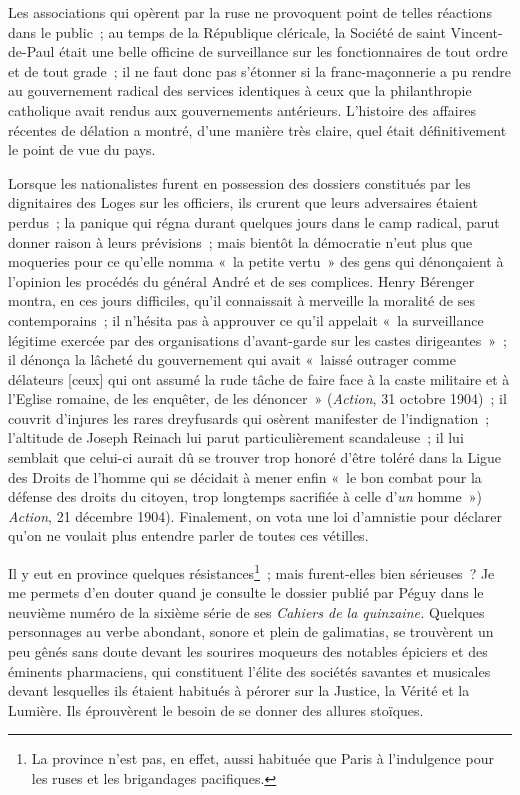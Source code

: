 \documentclass[french,twoside]{book} %
\begin{document}
Les associations qui opèrent par la ruse ne provoquent point de telles réactions dans le public ; au temps de la République cléricale, la Société de saint Vincent-de-Paul était une belle officine de surveillance sur les fonctionnaires de tout ordre et de tout grade ; il ne faut donc pas s’étonner si la franc-maçonnerie a pu rendre au gouvernement radical des services identiques à ceux que la philanthropie catholique avait rendus aux gouvernements antérieurs. L’histoire des affaires récentes de délation a montré, d’une manière très claire, quel était définitivement le point de vue du pays.\par
Lorsque les nationalistes furent en possession des dossiers constitués par les dignitaires des Loges sur les officiers, ils crurent que leurs adversaires étaient perdus ; la panique qui régna durant quelques jours dans le camp radical, parut donner raison à leurs prévisions ; mais bientôt la démocratie n’eut plus que moqueries pour ce qu’elle nomma « la petite vertu » des gens qui dénonçaient à l’opinion les procédés du général André et de ses complices. Henry Bérenger montra, en ces jours difficiles, qu’il connaissait à merveille la moralité de ses contemporains ; il n’hésita pas à approuver ce qu’il appelait « la surveillance légitime exercée par des organisations d’avant-garde sur les castes dirigeantes » ; il dénonça la lâcheté du gouvernement qui avait « laissé outrager comme délateurs [ceux] qui ont assumé la rude tâche de faire face à la caste militaire et à l’Eglise romaine, de les enquêter, de les dénoncer » (\emph{Action}, 31 octobre 1904) ; il couvrit d’injures les rares dreyfusards qui osèrent manifester de  l’indignation ; l’altitude de Joseph Reinach lui parut particulièrement scandaleuse ; il lui semblait que celui-ci aurait dû se trouver trop honoré d’être toléré dans la Ligue des Droits de l’homme qui se décidait à mener enfin « le bon combat pour la défense des droits du citoyen, trop longtemps sacrifiée à celle d’\emph{un} homme ») \emph{Action}, 21 décembre 1904). Finalement, on vota une loi d’amnistie pour déclarer qu’on ne voulait plus entendre parler de toutes ces vétilles.\par
Il y eut en province quelques résistances\footnote{ \noindent La province n’est pas, en effet, aussi habituée que Paris à l’indulgence pour les ruses et les brigandages pacifiques.
 } ; mais furent-elles bien sérieuses ? Je me permets d’en douter quand je consulte le dossier publié par Péguy dans le neuvième numéro de la sixième série de ses \emph{Cahiers de la quinzaine.} Quelques personnages au verbe abondant, sonore et plein de galimatias, se trouvèrent un peu gênés sans doute devant les sourires moqueurs des notables épiciers et des éminents pharmaciens, qui constituent l’élite des sociétés savantes et musicales devant lesquelles ils étaient habitués à pérorer sur la Justice, la Vérité et la Lumière. Ils éprouvèrent le besoin de se donner des allures stoïques.\par
\end{document}
